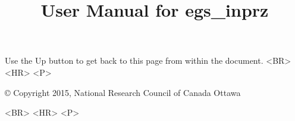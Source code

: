 \documentclass[12pt,twoside]{article}   %
\begin{document}

\setlength{\baselineskip}{0.5cm}


\begin{htmlonly}



\begin{rawhtml}
Use the Up button to get back to this page from within the document.
<BR> <HR> <P>
\end{rawhtml}

\copyright
Copyright 2015, National Research Council of Canada
Ottawa

\begin{rawhtml}
<BR> <HR> <P>
\end{rawhtml}

\end{htmlonly}

\pagestyle{empty}

\title{User Manual for egs\_inprz}
\end{document}
